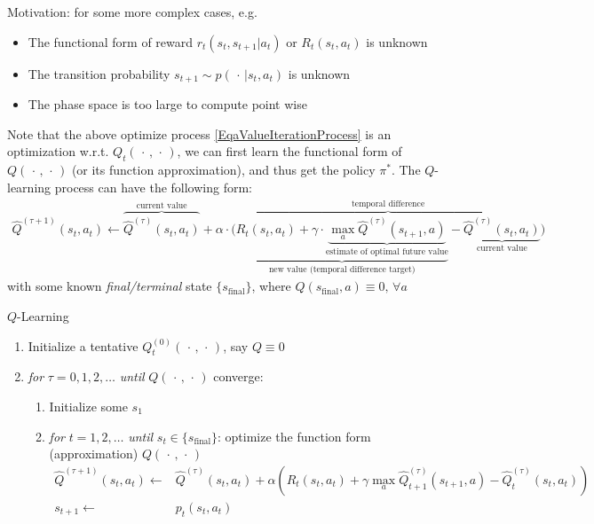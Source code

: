 Motivation: for some more complex cases, e.g.
\begin{itemize}[topsep=2pt,itemsep=0pt]
    \item The functional form of reward $ r_t(s_t,s_{t+1}|a_t) $ or $ R_{t}(s_t,a_t) $ is unknown
    \item The transition probability $ s_{t+1}\sim p(\, \cdot \, |s_t,a_t) $ is unknown
    \item The phase space is too large to compute point wise
\end{itemize}
Note that the above optimize process \autoref{EqaValueIterationProcess} is an optimization w.r.t. $ Q_t(\, \cdot \, ,\, \cdot \, ) $, we can first learn the functional form of $ Q(\, \cdot \, ,\, \cdot \, ) $ (or its function approximation), and thus get the policy $ \pi^* $. The $ Q $-learning process can have the following form:
\begin{align}
    \hat{Q}^{(\tau+1)}(s_{t},a_{t})\leftarrow \overbrace {\hat{Q}^{(\tau)}(s_{t},a_{t})}^{\text{current value}}+\alpha \cdot \overbrace{\bigg(\underbrace {R_t(s_t,a_t)+\gamma \cdot \underbrace {\max _{a}\hat{Q}^{(\tau)}(s_{t+1},a)} _{\text{estimate of optimal future value}}} _{\text{new value (temporal difference target)}}-\underbrace {\hat{Q}^{(\tau)}(s_{t},a_{t})} _{\text{current value}}\bigg )} ^{\text{temporal difference}}
\end{align}
with some known \textit{final/terminal} state $ \{s_\mathrm{final} \} $, where $ Q(s_\mathrm{final},a )\equiv 0,\,\forall a $


\begin{algorithm}{$ Q $-Learning}
\begin{enumerate}[topsep=2pt,itemsep=2pt]
    \item Initialize a tentative $ Q^{(0)}_{t}(\, \cdot \, ,\, \cdot \, ) $, say $ Q\equiv 0 $
    \item \textit{for} $ \tau=0,1,2,\ldots $ \textit{until} $ Q(\, \cdot \, ,\, \cdot \, ) $ converge:
    \begin{enumerate}[topsep=2pt,itemsep=2pt]
        \item Initialize some $ s_1 $
        \item \textit{for} $ t=1,2,\ldots $ \textit{until} $ s_{t}\in\{s_\mathrm{final} \} $: optimize the function form (approximation) $ Q(\, \cdot \, ,\, \cdot \, ) $
        \begin{align}
            \hat{Q}^{(\tau+1)}(s_t,a_t)\leftarrow& \hat{Q}^{(\tau)}(s_t,a_t)+\alpha \left(R_t(s_t,a_t)+\gamma \mathop{\max}\limits_{a}\hat{Q}^{(\tau)}_{t+1}(s_{t+1},a)-\hat{Q}^{(\tau)}_t(s_t,a_t) \right)\\
            s_{t+1}\leftarrow& p_t(s_t,a_t)
        \end{align}
    \end{enumerate}
\end{enumerate}
\end{algorithm}
    



